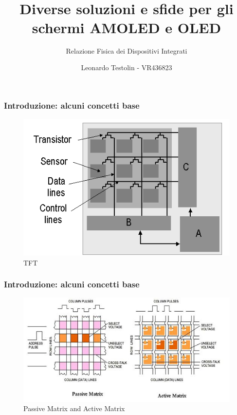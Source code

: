 \documentclass[12pt]{beamer}
\begin{document}
	\author{Leonardo Testolin - VR436823}
	\title{Diverse soluzioni e sfide per gli schermi AMOLED e OLED}
	\subtitle{Relazione Fisica dei Dispositivi Integrati}
	\begin{frame}[plain]
		\maketitle
	\end{frame}
	
	\begin{frame}
		\frametitle{Introduzione: alcuni concetti base}
		\begin{figure}[h]
			\centering
			\includegraphics[width=1\textwidth]{IMMAGINI/arraydiag}
			\caption{TFT}
			\label{TFT}
		\end{figure}
	\end{frame}
	\begin{frame}
		\frametitle{Introduzione: alcuni concetti base}
		\begin{figure}
			\centering
			\includegraphics[width=1\linewidth]{IMMAGINI/matrix_passive}
			\caption{ Passive Matrix and Active Matrix}
			\label{fig:matrixpassive}
		\end{figure}
	\end{frame}
\end{document}
